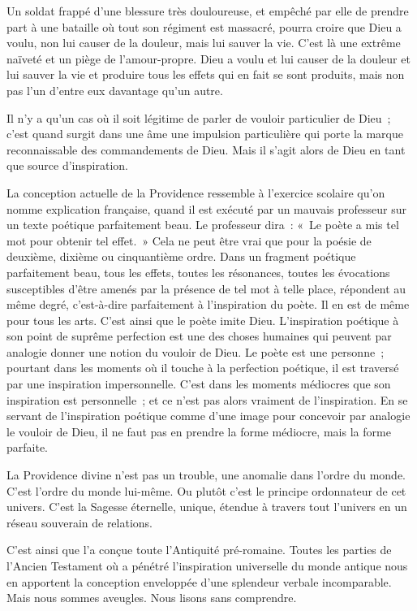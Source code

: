 \documentclass[french,twoside]{book} %
\begin{document}
Un soldat frappé d'une blessure très douloureuse, et empêché par elle de prendre part à une bataille où tout son régiment est massacré, pourra croire que Dieu a voulu, non lui causer de la douleur, mais lui sauver la vie. C'est là une extrême naïveté et un piège de l'amour-propre. Dieu a voulu et lui causer de la douleur et lui sauver la vie et produire tous les effets qui en fait se sont produits, mais non pas l'un d'entre eux davantage qu'un autre.\par
Il n'y a qu'un cas où il soit légitime de parler de vouloir particulier de Dieu ; c'est quand surgit dans une âme une impulsion particulière qui porte la marque reconnaissable des commandements de Dieu. Mais il s'agit alors de Dieu en tant que source d'inspiration.\par
La conception actuelle de la Providence ressemble à l'exercice scolaire qu'on nomme explication française, quand il est exécuté par un mauvais professeur sur un texte poétique parfaitement beau. Le professeur dira : « Le poète a mis tel mot pour obtenir tel effet. » Cela ne peut être vrai que pour la poésie de deuxième, dixième ou cinquantième ordre. Dans un fragment poétique parfaitement beau, tous les effets, toutes les résonances, toutes les évocations susceptibles d'être amenés par la présence de tel mot à telle place, répondent au même degré, c'est-à-dire parfaitement à l'inspiration du poète. Il en est de même pour tous les arts. C'est ainsi que le poète imite Dieu. L'inspiration poétique à son point de suprême perfection est une des choses humaines qui peuvent par analogie donner une notion du vouloir de Dieu. Le poète est une personne ; pourtant dans les moments où il touche à la perfection poétique, il est traversé par une inspiration impersonnelle. C'est dans les moments médiocres que son inspiration est personnelle ; et ce n'est pas alors vraiment de l'inspiration. En se servant de l'inspiration poétique comme d'une image pour concevoir par analogie le vouloir de Dieu, il ne faut pas en prendre la forme médiocre, mais la forme parfaite.\par
La Providence divine n'est pas un trouble, une anomalie dans l'ordre du monde. C'est l'ordre du monde lui-même. Ou plutôt c'est le principe ordonnateur de cet univers. C'est la Sagesse éternelle, unique, étendue à travers tout l'univers en un réseau souverain de relations.\par
C'est ainsi que l'a conçue toute l'Antiquité pré-romaine. Toutes les parties de l'Ancien Testament où a pénétré l'inspiration universelle du monde antique nous en apportent la conception enveloppée d'une splendeur verbale incomparable. Mais nous sommes aveugles. Nous lisons sans comprendre.\par
\end{document}
